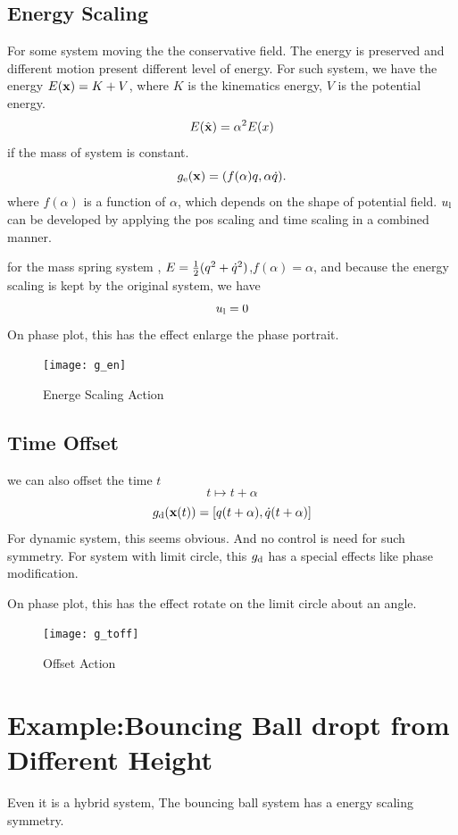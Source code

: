 \subsection*{Energy Scaling}
For some system moving the the conservative field.
The energy is preserved and different motion present different level of energy.
For such system, we have the energy $E(\mathbf{x})=K+V$, where $K$ is the kinematics energy,
$V$ is the potential energy.
\[
E(\hat{\mathbf{x}})=\alpha^2 E(x)
\]
if the mass of system is constant.
\[
g_{\mathrm{e}}(\mathbf{x})=(f(\alpha) q,\alpha \dot{q}).
\]
where $f(\alpha)$ is a function of $\alpha$, which depends on the shape of potential field.
$u_{\mathrm{l}}$ can be developed by applying the pos scaling and time scaling in a combined manner.



for the mass spring system , $E=\frac{1}{2}(q^2+\dot{q}^2)$,$f(\alpha)=\alpha$, and because the energy scaling is kept by the original system, we have
\[
u_{\mathrm{l}}=0
\]
On phase plot, this has the effect enlarge the phase portrait.

\begin{figure}[!htbp]
  \begin{center}
      \texttt{[image: g\_en]}
    \caption{Energe Scaling Action}
    \label{fig:gen}
\end{center}
\end{figure}


\subsection*{Time Offset}
we can also offset the time $t$
\[
t \mapsto t+\alpha
\]
\[
g_{\mathrm{d}}(\mathbf{x}(t))=[q(t+\alpha),\dot{q}(t+\alpha)]
\]
For dynamic system, this seems obvious. And no control is need for such symmetry.
For system with limit circle, this $g_{\mathrm{d}}$ has a special effects like phase modification.

On phase plot, this has the effect rotate on the limit circle about an angle.
\begin{figure}[!htbp]
  \begin{center}
      \texttt{[image: g\_toff]}
    \caption{Offset Action}
    \label{fig:gtoff}
\end{center}
\end{figure}





\section{Example:Bouncing Ball dropt from Different Height}
Even it is a hybrid system,
The bouncing ball system has a energy scaling symmetry.

